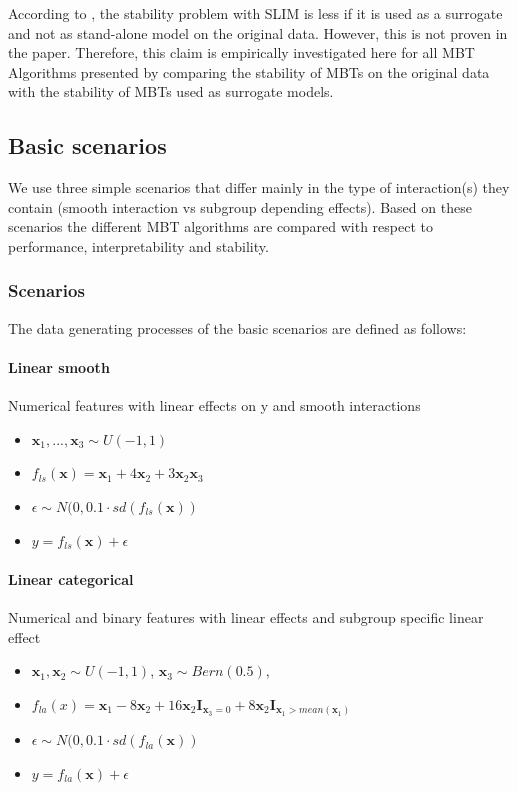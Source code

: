 According to \citep{Hu.2020}, the stability problem with SLIM is less if it is used as a surrogate and not as stand-alone model on the original data. However, this is not proven in the paper. Therefore, this claim is empirically investigated here for all MBT Algorithms presented by comparing the stability of MBTs on the original data with the stability of MBTs used as surrogate models.





\subsection{Basic scenarios}
We use three simple scenarios that differ mainly in the type of interaction(s) they contain (smooth interaction vs subgroup depending effects). Based on these scenarios the different MBT algorithms are compared with respect to performance, interpretability and stability.


\subsubsection{Scenarios}
The data generating processes of the basic scenarios are defined as follows:


\paragraph{Linear smooth}
Numerical features with linear effects on y and smooth interactions
\begin{itemize}
    \item $\textbf{x}_1,..., \textbf{x}_{3} \sim U(-1,1)$
    \item $ f_{ls}(\textbf{x}) = \textbf{x}_1 + 4   \textbf{x}_2 + 3   \textbf{x}_2   \textbf{x}_3 $
    \item $\epsilon \sim N(0, 0.1 \cdot sd(f_{ls}(\textbf{x}))$
    \item $y = f_{ls}(\textbf{x}) + \epsilon$
\end{itemize}             


\paragraph{Linear categorical}
Numerical and binary features with linear effects and subgroup specific linear effect
\begin{itemize}
    \item $\textbf{x}_1, \textbf{x}_2 \sim U(-1,1)$, $\textbf{x}_3 \sim Bern(0.5)$,  
    \item $ f_{la}(x) =  \textbf{x}_{1} - 8  \textbf{x}_2 + 16  \textbf{x}_2  \mathbf{I}_{\textbf{x}_3 = 0} + 8  \textbf{x}_2  \mathbf{I}_{\textbf{x}_1 > mean(\textbf{x}_1)} $
    \item $\epsilon \sim N(0, 0.1 \cdot sd(f_{la}(\textbf{x}))$
    \item $y = f_{la}(\textbf{x}) + \epsilon$          
\end{itemize}



